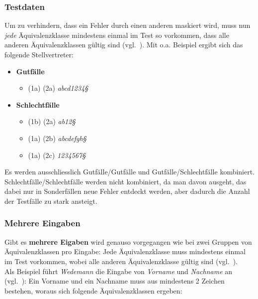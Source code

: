 \subsubsection*{Testdaten}
Um zu verhindern, dass ein Fehler durch einen anderen maskiert wird, muss nun \textit{jede} Äquivalenzklasse mindestens einmal im Test so vorkommen, dass alle anderen Äquivalenzklassen gültig sind (vgl.~\cite[44]{Wed09c}).
Mit o.a. Beispiel ergibt sich das folgende Stellvertreter:

\begin{itemize}
    \item \textbf{Gutfälle}
    \begin{itemize}
        \item[] (1a) (2a) \textit{abcd1234§}
    \end{itemize}
    \item \textbf{Schlechtfälle}
    \begin{itemize}
        \item[] (1b) (2a) \textit{ab12§}
        \item[] (1a) (2b) \textit{abcdefgh§}
        \item[] (1a) (2c) \textit{1234567§}
    \end{itemize}
\end{itemize}

\vspace{2mm}
\begin{tcolorbox}[colback=white]
    Es werden ausschliesslich Gutfälle/Gutfälle und Gutfälle/Schlechtfälle kombiniert.
    Schlechtfälle/Schlechtfälle werden nicht kombiniert, da man davon ausgeht, das dabei nur in Sonderfällen neue Fehler entdeckt werden, aber dadurch die Anzahl der Testfälle zu stark ansteigt.
\end{tcolorbox}
\vspace{2mm}

\subsubsection*{Mehrere Eingaben}
Gibt es \textbf{mehrere Eigaben} wird genauso vorgegangen wie bei zwei Gruppen von Äquivalenzklassen pro Eingabe: Jede Äquivalenzklasse muss mindestens einmal im Test vorkommen, wobei alle anderen Äquivalenzklasse gültig sind (vgl.~\cite[44]{Wed09c}).\\
Als Beispiel führt \textit{Wedemann} die Eingabe von \textit{Vorname} und \textit{Nachname} an (vgl.~\cite[44]{Wed09c}): Ein Vorname und ein Nachname muss aus mindestens 2 Zeichen bestehen, woraus sich folgende Äquivalenzklassen ergeben:

